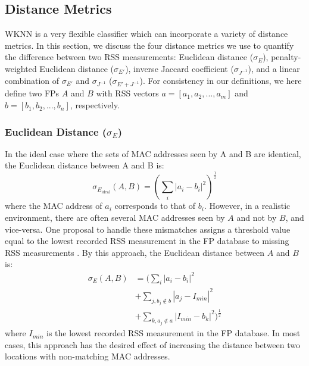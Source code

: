 \documentclass[conference]{IEEEtran}
\begin{document}
\subsection{Distance Metrics}\label{subsec:distance_metrics}
WKNN is a very flexible classifier which can incorporate a variety of distance metrics. In this section, we discuss the four distance metrics we use to quantify the difference between two RSS measurements: Euclidean distance ($\sigma_E$), penalty-weighted Euclidean distance ($\sigma_{E'}$), inverse Jaccard coefficient ($\sigma_{J^{-1}}$), and a linear combination of $\sigma_{E'}$ and $\sigma_{J^{-1}}$ ($\sigma_{E' + J^{-1}}$). For consistency in our definitions, we here define two FPs $A$ and $B$ with RSS vectors $a=[a_1, a_2, ... , a_m]$ and $b=[b_1, b_2, ... , b_n]$, respectively. 

\subsubsection{Euclidean Distance ($\sigma_E$)}

\indent In the ideal case where the sets of MAC addresses seen by A and B are identical, the Euclidean distance between A and B is:
\begin{equation}
\label{eq:euclidean_ideal}
\sigma_{E_{\text{ideal}}}(A, B) = (\sum\limits_{i}|a_i - b_i|^2)^\frac{1}{2}
\end{equation}
where the MAC address of $a_i$ corresponds to that of $b_i$. However, in a realistic environment, there are often several MAC addresses seen by $A$ and not by $B$, and vice-versa. One proposal to handle these mismatches assigns a threshold value equal to the lowest recorded RSS measurement in the FP database to missing RSS measurements \cite{Kemppi}. By this approach, the Euclidean distance between $A$ and $B$ is:
\begin{equation}
\label{eq:euclidean}
\begin{split}
\sigma_{E}(A, B) & = (\sum\limits_{i}|a_i-b_i|^2 \\
			& +  \sum\limits_{j, b_j\notin b}|a_j-I_{min}|^2 \\
			& + \sum\limits_{k, a_j\notin a}|I_{min}-b_k|^2)^\frac{1}{2}
\end{split}
\end{equation}
where $I_{min}$ is the lowest recorded RSS measurement in the FP database. In most cases, this approach has the desired effect of increasing the distance between two locations with non-matching MAC addresses.
\end{document}
